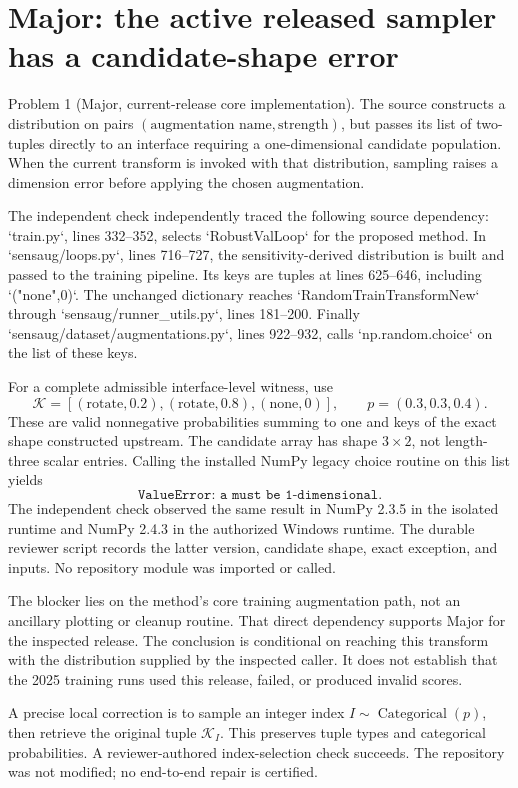 \documentclass[10pt]{article}
\begin{document}
\section*{Major: the active released sampler has a candidate-shape error}
Problem 1 (Major, current-release core implementation).  The source constructs a distribution on pairs \((\text{augmentation name},\text{strength})\), but passes its list of two-tuples directly to an interface requiring a one-dimensional candidate population. When the current transform is invoked with that distribution, sampling raises a dimension error before applying the chosen augmentation.\par
The independent check independently traced the following source dependency: `train.py`, lines 332–352, selects `RobustValLoop` for the proposed method. In `sensaug/loops.py`, lines 716–727, the sensitivity-derived distribution is built and passed to the training pipeline. Its keys are tuples at lines 625–646, including `("none",0)`. The unchanged dictionary reaches `RandomTrainTransformNew` through `sensaug/runner\_utils.py`, lines 181–200. Finally `sensaug/dataset/augmentations.py`, lines 922–932, calls `np.random.choice` on the list of these keys.\par
For a complete admissible interface-level witness, use \[\mathcal{K}=[(\mathrm{rotate},0.2),(\mathrm{rotate},0.8),
                 (\mathrm{none},0)],\qquad
 p=(0.3,0.3,0.4).\] These are valid nonnegative probabilities summing to one and keys of the exact shape constructed upstream. The candidate array has shape \(3\times2\), not length-three scalar entries. Calling the installed NumPy legacy choice routine on this list yields \[\texttt{ValueError: a must be 1-dimensional}.\] The independent check observed the same result in NumPy 2.3.5 in the isolated runtime and NumPy 2.4.3 in the authorized Windows runtime. The durable reviewer script records the latter version, candidate shape, exact exception, and inputs. No repository module was imported or called.\par
The blocker lies on the method’s core training augmentation path, not an ancillary plotting or cleanup routine. That direct dependency supports Major for the inspected release. The conclusion is conditional on reaching this transform with the distribution supplied by the inspected caller. It does not establish that the 2025 training runs used this release, failed, or produced invalid scores.\par
A precise local correction is to sample an integer index \(I\sim\operatorname{Categorical}(p)\), then retrieve the original tuple \(\mathcal{K}_I\). This preserves tuple types and categorical probabilities. A reviewer-authored index-selection check succeeds. The repository was not modified; no end-to-end repair is certified.\par
\end{document}
